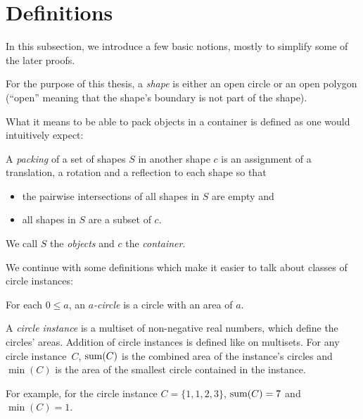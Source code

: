 \documentclass[a4paper,style=print,oneside,bibliography=totoc,nexus,lnum,extramargin]{tubsbook}
\begin{document}
\section{Definitions}

In this subsection, we introduce a few basic notions, mostly to simplify some of the later proofs.

\begin{definition}
    For the purpose of this thesis, a \emph{shape} is either an open circle or an open polygon (“open” meaning that the shape's boundary is not part of the shape).
\end{definition}

What it means to be able to pack objects in a container is defined as one would intuitively expect:

\begin{definition}
    A \emph{packing} of a set of shapes $S$ in another shape $c$ is an assignment of a translation, a rotation and a reflection to each shape so that

    \begin{itemize}
        \item the pairwise intersections of all shapes in $S$ are empty and
        \item all shapes in $S$ are a subset of $c$.
    \end{itemize}

    We call $S$ the \emph{objects} and $c$ the \emph{container}.
\end{definition}

We continue with some definitions which make it easier to talk about classes of circle instances:

\begin{definition}
    For each $0 \le a$, an \emph{$a$-circle} is a circle with an area of $a$.
\end{definition}

\begin{definition}\label{def:circle-instance}
    A \emph{circle instance} is a multiset of non-negative real numbers, which define the circles' areas. Addition of circle instances is defined like on multisets.
    For any circle instance~$C$, $\operatorname{sum}(C)$ is the combined area of the instance's circles and $\min(C)$ is the area of the smallest circle contained in the instance.
\end{definition}

For example, for the circle instance $C = \{1,1,2,3\}$, $\operatorname{sum}(C) = 7$ and $\min(C) = 1$.
\end{document}
